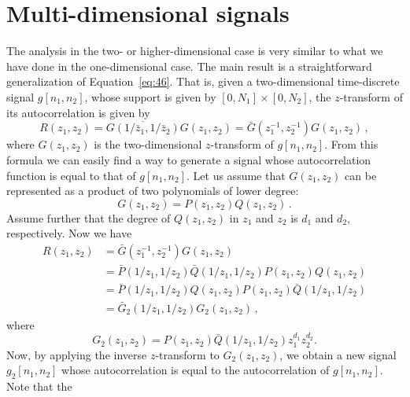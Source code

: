 \section{Multi-dimensional signals}
\label{sec:multi-dimens-case}
The analysis in the two- or higher-dimensional case
is very similar to what we have done in the one-dimensional case. The
main result is a straightforward generalization of
Equation~\eqref{eq:46}. That is, given a two-dimensional time-discrete
signal $g[n_{1}, n_{2}]$, whose support is given by
$[0,N_{1}]\times[0,N_{2}]$, the $z$-transform of its autocorrelation is
given by
\begin{equation}
  \label{eq:124}
  R(z_{1}, z_{2}) = \overline{G(1/\bar z_{1}, 1/\bar z_{2})}G(z_{1}, z_{2}) =
  \bar G(z_{1}^{-1},z_{2}^{-1} ) G(z_{1}, z_{2})\,,
\end{equation}
where $G(z_{1}, z_{2})$ is the two-dimensional $z$-transform of
$g[n_{1}, n_{2}]$. From this formula we can easily find a way to
generate a signal whose autocorrelation function is equal to that
of $g[n_{1}, n_{2}]$. Let us assume that $G(z_{1}, z_{2})$ can be
represented as a product of two polynomials of lower degree:
\begin{equation}
  \label{eq:125}
  G(z_{1}, z_{2}) = P(z_{1}, z_{2})Q(z_{1}, z_{2}) \,. 
\end{equation}
Assume further that the degree of $Q(z_{1}, z_{2})$ in $z_{1}$ and
$z_{2}$ is $d_{1}$ and $d_{2}$, respectively.
Now we have
\begin{equation}
  \label{eq:126}
  \begin{split}
    R(z_{1}, z_{2})
    & = \bar G(z_{1}^{-1},z_{2}^{-1} ) G(z_{1}, z_{2})\\
    & = \bar P(1/z_{1}, 1/z_{2}) \bar Q(1/z_{1}, 1/z_{2}) P(z_{1},
    z_{2})Q(z_{1}, z_{2})\\
    & = \bar P(1/z_{1}, 1/z_{2})Q(z_{1}, z_{2})
    P(z_{1},z_{2}) \bar Q(1/z_{1}, 1/z_{2})\\
    & = \bar G_{2}(1/z_{1}, 1/z_{2}) G_{2}(z_{1}, z_{2})\,, 
  \end{split}
\end{equation}
where
\begin{equation}
  \label{eq:127}
  G_{2}(z_{1}, z_{2}) = P(z_{1},z_{2}) \bar Q(1/z_{1}, 1/z_{2})z_{1}^{d_{1}}z_{2}^{d_{2}}.
\end{equation}
Now, by applying the inverse $z$-transform to  $G_{2}(z_{1},z_{2})$, we
obtain a new signal $g_{2}[n_{1}, n_{2}]$ whose autocorrelation is
equal to the autocorrelation of $g[n_{1}, n_{2}]$. Note that the
